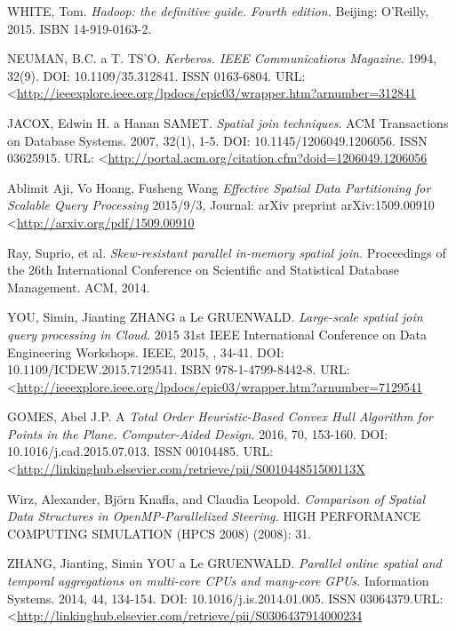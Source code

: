 \documentclass[a4paper,12pt,oneside]{report}
\begin{document}
\begin{thebibliography}{99}
\label{References}



WHITE, Tom. \textit{Hadoop: the definitive guide. Fourth edition.} Beijing: O'Reilly, 2015. ISBN 14-919-0163-2.

NEUMAN, B.C. a T. TS'O. \textit{Kerberos. IEEE Communications Magazine}. 1994, 32(9). DOI: 10.1109/35.312841. ISSN 0163-6804.  URL: \textless\url{http://ieeexplore.ieee.org/lpdocs/epic03/wrapper.htm?arnumber=312841}


JACOX, Edwin H. a Hanan SAMET. \textit{Spatial join techniques}. ACM Transactions on Database Systems. 2007, 32(1), 1-5. DOI: 10.1145/1206049.1206056. ISSN 03625915. URL: \textless\url{http://portal.acm.org/citation.cfm?doid=1206049.1206056}

Ablimit Aji, Vo Hoang, Fusheng Wang \textit{Effective Spatial Data Partitioning for Scalable Query Processing} 2015/9/3,
Journal: arXiv preprint arXiv:1509.00910 \textless\url{http://arxiv.org/pdf/1509.00910}

Ray, Suprio, et al. \textit{Skew-resistant parallel in-memory spatial join.} Proceedings of the 26th International Conference on Scientific and Statistical Database Management. ACM, 2014.

YOU, Simin, Jianting ZHANG a Le GRUENWALD. \textit{Large-scale spatial join query processing in Cloud.} 2015 31st IEEE International Conference on Data Engineering Workshops. IEEE, 2015, , 34-41. DOI: 10.1109/ICDEW.2015.7129541. ISBN 978-1-4799-8442-8. URL: \textless\url{http://ieeexplore.ieee.org/lpdocs/epic03/wrapper.htm?arnumber=7129541}

GOMES, Abel J.P. A \textit{Total Order Heuristic-Based Convex Hull Algorithm for Points in the Plane. Computer-Aided Design.} 2016, 70, 153-160. DOI: 10.1016/j.cad.2015.07.013. ISSN 00104485.  URL: \textless\url{http://linkinghub.elsevier.com/retrieve/pii/S001044851500113X}

Wirz, Alexander, Björn Knafla, and Claudia Leopold. \textit{Comparison of Spatial Data Structures in OpenMP-Parallelized Steering.} HIGH PERFORMANCE COMPUTING  SIMULATION (HPCS 2008) (2008): 31.

ZHANG, Jianting, Simin YOU a Le GRUENWALD. \textit{Parallel online spatial and temporal aggregations on multi-core CPUs and many-core GPUs.} Information Systems. 2014, 44, 134-154. DOI: 10.1016/j.is.2014.01.005. ISSN 03064379.URL:  \textless\url{http://linkinghub.elsevier.com/retrieve/pii/S0306437914000234}



\end{thebibliography}
\end{document}
